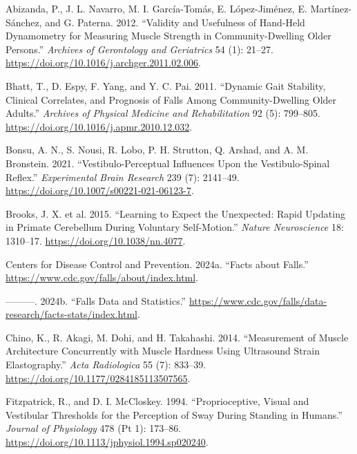 \documentclass[
  letterpaper,
  DIV=11,
  numbers=noendperiod]{scrartcl}
\newlength{\cslhangindent}
\newenvironment{CSLReferences}[2] %
 {\begin{list}{}{%
  \setlength{\itemindent}{0pt}
  \setlength{\leftmargin}{0pt}
  \setlength{\parsep}{0pt}
  \ifodd #1
   \setlength{\leftmargin}{\cslhangindent}
   \setlength{\itemindent}{-1\cslhangindent}
  \fi
  \setlength{\itemsep}{#2\baselineskip}}}
 {\end{list}}
\begin{document}
\label{refs}
\begin{CSLReferences}{1}{0}
Abizanda, P., J. L. Navarro, M. I. García-Tomás, E. López-Jiménez, E.
Martínez-Sánchez, and G. Paterna. 2012. {``Validity and Usefulness of
Hand-Held Dynamometry for Measuring Muscle Strength in
Community-Dwelling Older Persons.''} \emph{Archives of Gerontology and
Geriatrics} 54 (1): 21--27.
\url{https://doi.org/10.1016/j.archger.2011.02.006}.

Bhatt, T., D. Espy, F. Yang, and Y. C. Pai. 2011. {``Dynamic Gait
Stability, Clinical Correlates, and Prognosis of Falls Among
Community-Dwelling Older Adults.''} \emph{Archives of Physical Medicine
and Rehabilitation} 92 (5): 799--805.
\url{https://doi.org/10.1016/j.apmr.2010.12.032}.

Bonsu, A. N., S. Nousi, R. Lobo, P. H. Strutton, Q. Arshad, and A. M.
Bronstein. 2021. {``Vestibulo-Perceptual Influences Upon the
Vestibulo-Spinal Reflex.''} \emph{Experimental Brain Research} 239 (7):
2141--49. \url{https://doi.org/10.1007/s00221-021-06123-7}.

Brooks, J. X. et al. 2015. {``Learning to Expect the Unexpected: Rapid
Updating in Primate Cerebellum During Voluntary Self-Motion.''}
\emph{Nature Neuroscience} 18: 1310--17.
\url{https://doi.org/10.1038/nn.4077}.

Centers for Disease Control and Prevention. 2024a. {``Facts about
Falls.''} \url{https://www.cdc.gov/falls/about/index.html}.

---------. 2024b. {``Falls Data and Statistics.''}
\url{https://www.cdc.gov/falls/data-research/facts-stats/index.html}.

Chino, K., R. Akagi, M. Dohi, and H. Takahashi. 2014. {``Measurement of
Muscle Architecture Concurrently with Muscle Hardness Using Ultrasound
Strain Elastography.''} \emph{Acta Radiologica} 55 (7): 833--39.
\url{https://doi.org/10.1177/0284185113507565}.

Fitzpatrick, R., and D. I. McCloskey. 1994. {``Proprioceptive, Visual
and Vestibular Thresholds for the Perception of Sway During Standing in
Humans.''} \emph{Journal of Physiology} 478 (Pt 1): 173--86.
\url{https://doi.org/10.1113/jphysiol.1994.sp020240}.


\end{CSLReferences}
\end{document}
